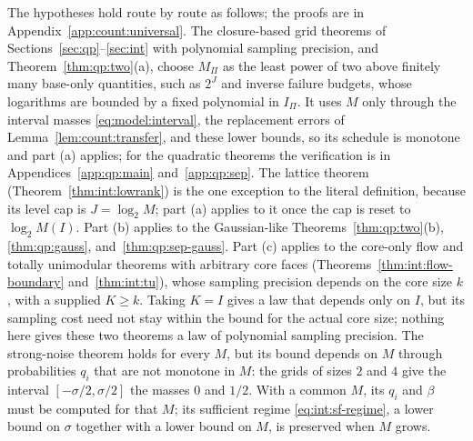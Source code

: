 The hypotheses hold route by route as follows; the proofs are in
Appendix~\ref{app:count:universal}. The closure-based grid theorems of
Sections~\ref{sec:qp}--\ref{sec:int} with polynomial sampling precision,
and Theorem~\ref{thm:qp:two}(a), choose $M_\Pi$ as the least power of two
above finitely many
base-only quantities, such as $2^J$ and inverse failure budgets, whose
logarithms are bounded by a fixed polynomial in $I_\Pi$. It uses $M$ only
through the interval masses \eqref{eq:model:interval}, the replacement errors
of Lemma~\ref{lem:count:transfer}, and these lower bounds, so its schedule is
monotone and part (a) applies; for the quadratic theorems the verification is
in Appendices~\ref{app:qp:main} and~\ref{app:qp:sep}. The lattice theorem
(Theorem~\ref{thm:int:lowrank}) is the one exception to the literal
definition, because its level cap is $J=\log_2M$; part (a) applies to it once
the cap is reset to $\log_2M(I)$. Part (b) applies to the Gaussian-like
Theorems~\ref{thm:qp:two}(b), \ref{thm:qp:gauss}, and~\ref{thm:qp:sep-gauss}.
Part (c) applies to the core-only flow and totally unimodular theorems with
arbitrary core faces (Theorems~\ref{thm:int:flow-boundary}
and~\ref{thm:int:tu}), whose sampling precision depends on the core size $k$,
with a supplied $K\ge k$. Taking $K=I$ gives a law that depends only on $I$,
but its sampling cost need not stay within the bound for the actual core
size; nothing here gives these two theorems a law of polynomial sampling
precision. The strong-noise theorem holds for every $M$, but its bound
depends on $M$ through probabilities $q_i$ that are not monotone in $M$: the
grids of sizes $2$ and $4$ give the interval $[-\sigma/2,\sigma/2]$ the masses
$0$ and $1/2$. With a common $M$, its $q_i$ and $\beta$ must be computed for
that $M$; its sufficient regime \eqref{eq:int:sf-regime}, a lower bound on
$\sigma$ together with a lower bound on $M$, is preserved when $M$ grows.


